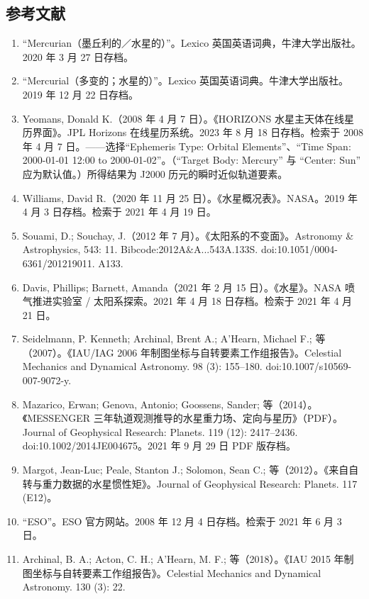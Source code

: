 \subsection{参考文献}
\begin{enumerate}
    \item “Mercurian（墨丘利的／水星的）”。Lexico 英国英语词典，牛津大学出版社。2020 年 3 月 27 日存档。
    \item “Mercurial（多变的；水星的）”。Lexico 英国英语词典。牛津大学出版社。2019 年 12 月 22 日存档。
    \item Yeomans, Donald K.（2008 年 4 月 7 日）。《HORIZONS 水星主天体在线星历界面》。JPL Horizons 在线星历系统。2023 年 8 月 18 日存档。检索于 2008 年 4 月 7 日。——选择“Ephemeris Type: Orbital Elements”、“Time Span: 2000-01-01 12:00 to 2000-01-02”。（“Target Body: Mercury” 与 “Center: Sun” 应为默认值。）所得结果为 J2000 历元的瞬时近似轨道要素。
    \item Williams, David R.（2020 年 11 月 25 日）。《水星概况表》。NASA。2019 年 4 月 3 日存档。检索于 2021 年 4 月 19 日。
    \item Souami, D.; Souchay, J.（2012 年 7 月）。《太阳系的不变面》。Astronomy \& Astrophysics, 543: 11. Bibcode:2012A\&A...543A.133S. doi:10.1051/0004-6361/201219011. A133.
    \item Davis, Phillips; Barnett, Amanda（2021 年 2 月 15 日）。《水星》。NASA 喷气推进实验室 / 太阳系探索。2021 年 4 月 18 日存档。检索于 2021 年 4 月 21 日。
    \item Seidelmann, P. Kenneth; Archinal, Brent A.; A'Hearn, Michael F.; 等（2007）。《IAU/IAG 2006 年制图坐标与自转要素工作组报告》。Celestial Mechanics and Dynamical Astronomy. 98 (3): 155–180. doi:10.1007/s10569-007-9072-y.
    \item Mazarico, Erwan; Genova, Antonio; Goossens, Sander; 等（2014）。《MESSENGER 三年轨道观测推导的水星重力场、定向与星历》（PDF）。Journal of Geophysical Research: Planets. 119 (12): 2417–2436. doi:10.1002/2014JE004675。2021 年 9 月 29 日 PDF 版存档。
    \item Margot, Jean-Luc; Peale, Stanton J.; Solomon, Sean C.; 等（2012）。《来自自转与重力数据的水星惯性矩》。Journal of Geophysical Research: Planets. 117 (E12)。
    \item “ESO”。ESO 官方网站。2008 年 12 月 4 日存档。检索于 2021 年 6 月 3 日。
    \item Archinal, B. A.; Acton, C. H.; A'Hearn, M. F.; 等（2018）。《IAU 2015 年制图坐标与自转要素工作组报告》。Celestial Mechanics and Dynamical Astronomy. 130 (3): 22.

\end{enumerate}
